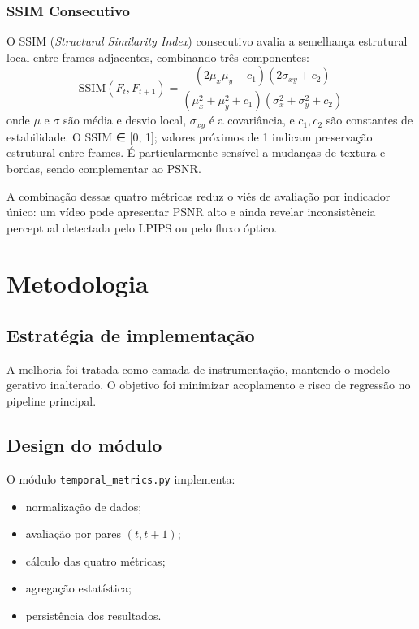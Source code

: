 \documentclass[conference]{IEEEtran}
\begin{document}
\subsubsection{SSIM Consecutivo}
O SSIM (\textit{Structural Similarity Index}) consecutivo avalia a semelhança estrutural local entre frames adjacentes, combinando três componentes:
\begin{equation}
    \mathrm{SSIM}(F_t, F_{t+1}) = \frac{(2\mu_x\mu_y + c_1)(2\sigma_{xy} + c_2)}{(\mu_x^2 + \mu_y^2 + c_1)(\sigma_x^2 + \sigma_y^2 + c_2)}
\end{equation}
onde $\mu$ e $\sigma$ são média e desvio local, $\sigma_{xy}$ é a covariância, e $c_1, c_2$ são constantes de estabilidade. O SSIM ∈ [0, 1]; valores próximos de 1 indicam preservação estrutural entre frames. É particularmente sensível a mudanças de textura e bordas, sendo complementar ao PSNR.

A combinação dessas quatro métricas reduz o viés de avaliação por indicador único: um vídeo pode apresentar PSNR alto e ainda revelar inconsistência perceptual detectada pelo LPIPS ou pelo fluxo óptico.

\section{Metodologia}
\subsection{Estratégia de implementação}
A melhoria foi tratada como camada de instrumentação, mantendo o modelo gerativo inalterado. O objetivo foi minimizar acoplamento e risco de regressão no pipeline principal.

\subsection{Design do módulo}
O módulo \texttt{temporal\_metrics.py} implementa:
\begin{itemize}
    \item normalização de dados;
    \item avaliação por pares $(t, t+1)$;
    \item cálculo das quatro métricas;
    \item agregação estatística;
    \item persistência dos resultados.
\end{itemize}
\end{document}
